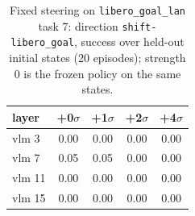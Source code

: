 \begin{table}[h]\centering\small
\begin{tabular}{lcccc}
\toprule
layer & +0$\sigma$ & +1$\sigma$ & +2$\sigma$ & +4$\sigma$ \\
\midrule
vlm 3 & 0.00 & 0.00 & 0.00 & 0.00 \\
vlm 7 & 0.05 & 0.05 & 0.00 & 0.00 \\
vlm 11 & 0.00 & 0.00 & 0.00 & 0.00 \\
vlm 15 & 0.00 & 0.00 & 0.00 & 0.00 \\
\bottomrule
\end{tabular}
\caption{Fixed steering on \texttt{libero\_goal\_lan} task 7: direction \texttt{shift-libero\_goal}, success over held-out initial states (20 episodes); strength 0 is the frozen policy on the same states.}
\end{table}

